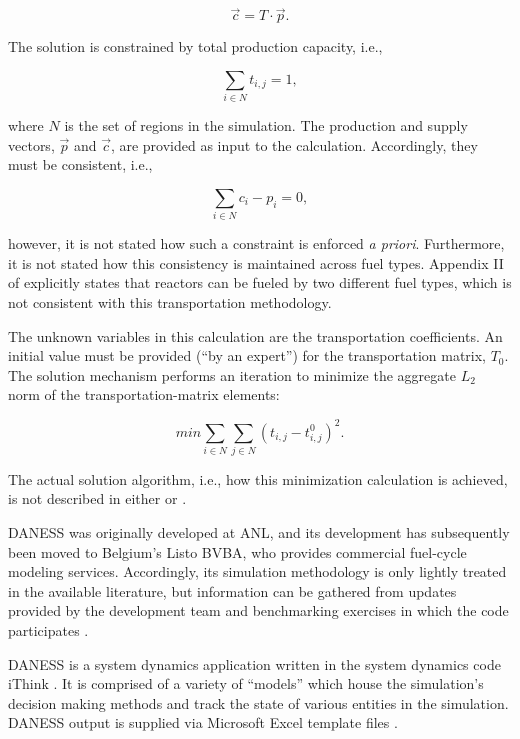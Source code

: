 \begin{equation}
\vec{c} = T \cdot \vec{p}.
\end{equation}

The solution is constrained by total production capacity, i.e., 

\begin{equation}
\sum_{i \in N} t_{i,j} = 1,
\end{equation}

where $N$ is the set of regions in the simulation. The production and supply
vectors, $\vec{p}$ and $\vec{c}$, are provided as input to the
calculation. Accordingly, they must be consistent, i.e.,

\begin{equation}
\sum_{i \in N} c_i - p_i = 0,
\end{equation}

however, it is not stated how such a constraint is enforced \textit{a
  priori}. Furthermore, it is not stated how this consistency is maintained
across fuel types. Appendix II of \cite{_international_2009} explicitly states
that reactors can be fueled by two different fuel types, which is not consistent
with this transportation methodology. 

The unknown variables in this calculation are the transportation
coefficients. An initial value must be provided (``by an expert'') for the
transportation matrix, $T_0$. The solution mechanism performs an iteration to
minimize the aggregate $L_2$ norm of the transportation-matrix elements:

\begin{equation}
min \sum_{i \in N} \sum_{j \in N} \left( t_{i,j} - t_{i,j}^0 \right)^2.
\end{equation}

The actual solution algorithm, i.e., how this minimization calculation is
achieved, is not described in either \cite{iaea_nuclear_2010} or
\cite{andrianova_desae_2008}.

DANESS was originally developed at ANL, and its development has subsequently
been moved to Belgium's Listo BVBA, who provides commercial fuel-cycle modeling
services. Accordingly, its simulation methodology is only lightly treated in the
available literature, but information can be gathered from updates provided by
the development team \cite{durpel_daness_2003,van_den_durpel_daness_2009} and
benchmarking exercises in which the code participates
\cite{guerin_benchmark_2009}.

DANESS is a system dynamics application written in the system dynamics code
iThink \cite{richmond_ithink_2004}. It is comprised of a variety of ``models''
which house the simulation's decision making methods and track the state of
various entities in the simulation. DANESS output is supplied via Microsoft
Excel template files \cite{guerin_benchmark_2009}.

